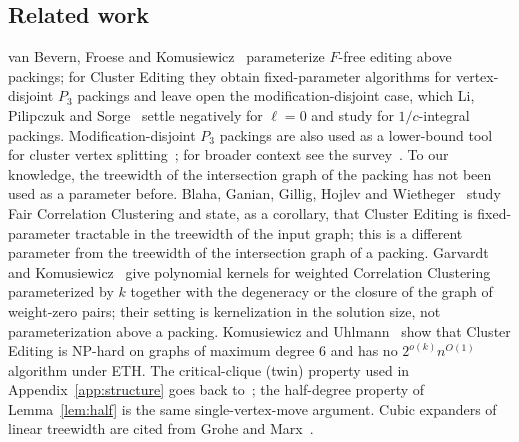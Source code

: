 \subsection{Related work}\label{sec:related}
van Bevern, Froese and Komusiewicz~\cite{BFK18} parameterize $F$-free editing above packings; for Cluster Editing they obtain fixed-parameter algorithms for vertex-disjoint $P_3$ packings and leave open the modification-disjoint case, which Li, Pilipczuk and Sorge~\cite{LPS23} settle negatively for $\ell=0$ and study for $1/c$-integral packings. Modification-disjoint $P_3$ packings are also used as a lower-bound tool for cluster vertex splitting~\cite{Split24}; for broader context see the survey~\cite{Crespelle23}. To our knowledge, the treewidth of the intersection graph of the packing has not been used as a parameter before. Blaha, Ganian, Gillig, Hojlev and Wietheger~\cite{BGGHW26} study Fair Correlation Clustering and state, as a corollary, that Cluster Editing is fixed-parameter tractable in the treewidth of the input graph; this is a different parameter from the treewidth of the intersection graph of a packing. Garvardt and Komusiewicz~\cite{GK26} give polynomial kernels for weighted Correlation Clustering parameterized by $k$ together with the degeneracy or the closure of the graph of weight-zero pairs; their setting is kernelization in the solution size, not parameterization above a packing. Komusiewicz and Uhlmann~\cite{KU12} show that Cluster Editing is NP-hard on graphs of maximum degree $6$ and has no $2^{o(k)}n^{O(1)}$ algorithm under ETH. The critical-clique (twin) property used in Appendix~\ref{app:structure} goes back to~\cite{Guo09,FLRS07}; the half-degree property of Lemma~\ref{lem:half} is the same single-vertex-move argument. Cubic expanders of linear treewidth are cited from Grohe and Marx~\cite{GM09}.
